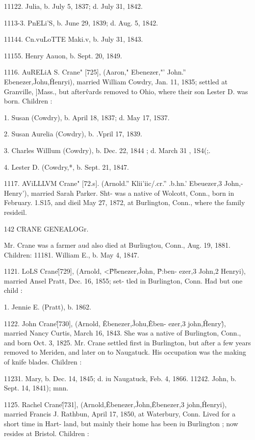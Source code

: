 \documentclass{book}
\begin{document}
11122. Julia, b. July 5, 1837; d. July 31, 1842. 

1113-3. PnELi'S, b. June 29, 1839; d. Aug. 5, 1842. 

11144. Cn.vuLoTTE Maki.v, b. July 31, 1843. 

11155. Henry Aauon, b. Sept. 20, 1849. 

1116. AuRELiA S. Crane" [725], (Aaron," Ebenezer,"' John.'' 
Ebenezer,\^ Johu,\^ Henryi), married William Cowdry, Jan. 11, 
1835; settled at Granville, ]Mass., but after\^vards removed to 
Ohio, where their son Lester D. was born. Children : 

1. Susan (Cowdry), b. April 18, 1837; d. May 17, 1S37. 

2. Susan Aurelia (Cowdry), b. .Vpril 17, 1839. 

3. Charles Willlum (Cowdry), b. Dec. 22, 1844 ; d. March 31 , 1S4(;. 

4. Lester D. (Cowdry,*, b. Sept. 21, 1847. 

1117. AViLLLVM Crane" [72.s]. (Arnold.'' Klii'iic/.cr.'' .b.hn.' 
Ebeuezer,3 John,- Henry'), married Sarah Parker. Sht- was a 
native of Wolcott, Conn., born in February. 1.S15, and dieil 
May 27, 1872, at Burlington, Conn., where the family resideil. 



142 CRANE GENEALOGr. 

Mr. Crane was a farmer aud also died at Burliugtou, Conn., Aug. 
19, 1881. Children: 
11181. William E., b. May 4, 1847. 

1121. LoLS Crane\^ [729], (Arnold, <\^ P\^benezer,\^ John, \^ P:ben- 
ezer,3 John,2 Henryi), married Ansel Pratt, Dec. 16, 1855; set- 
tled in Burlington, Conn. Had but one child : 

1. Jennie E. (Pratt), b. 1862. 

1122. John Crane\^ [730], (Arnold, \^ Ebenezer,\^ Johu,\^ Eben- 
ezer,3 john,\^ Henry\^), married Nancy Curtis, March 16, 1843. 
She was a native of Burlington, Conn., and born Oct. 3, 1825. 
Mr. Crane settled first in Burlington, but after a few years 
removed to Meriden, and later on to Naugatuck. His occupation 
was the making of knife blades. Children : 

11231. Mary, b. Dec. 14, 1845; d. iu Naugatuck, Feb. 4, 1866. 
11242. John, b. Sept. 14, 1841); mnn. 

1125. Rachel Crane\^ [731], (Arnold,\^ Ebenezer,\^ John,\^ 
Ebenezer,3 john,\^ Henryi), married Francis J. Rathbun, April 
17, 1850, at Waterbury, Conn. Lived for a short time in Hart- 
land, but mainly their home has been iu Burlington ; now resides 
at Bristol. Children : 
\end{document}
